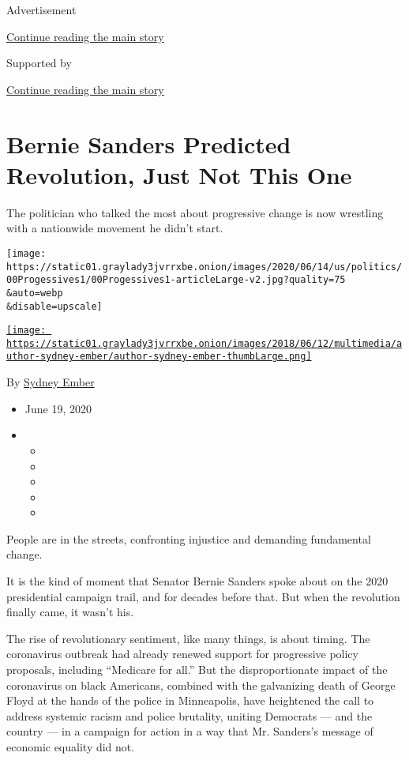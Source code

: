Advertisement

\protect\hyperlink{after-top}{Continue reading the main story}

Supported by

\protect\hyperlink{after-sponsor}{Continue reading the main story}

\hypertarget{bernie-sanders-predicted-revolution-just-not-this-one}{%
\section{Bernie Sanders Predicted Revolution, Just Not This
One}\label{bernie-sanders-predicted-revolution-just-not-this-one}}

The politician who talked the most about progressive change is now
wrestling with a nationwide movement he didn't start.

\texttt{[image: https://static01.graylady3jvrrxbe.onion/images/2020/06/14/us/politics/00Progessives1/00Progessives1-articleLarge-v2.jpg?quality=75\\\&auto=webp\\\&disable=upscale]}

\href{https://www.nytimes3xbfgragh.onion/by/sydney-ember}{\texttt{[image: https://static01.graylady3jvrrxbe.onion/images/2018/06/12/multimedia/author-sydney-ember/author-sydney-ember-thumbLarge.png]}}

By \href{https://www.nytimes3xbfgragh.onion/by/sydney-ember}{Sydney
Ember}

\begin{itemize}
\item
  June 19, 2020
\item
  \begin{itemize}
  \item
  \item
  \item
  \item
  \item
  \end{itemize}
\end{itemize}

People are in the streets, confronting injustice and demanding
fundamental change.

It is the kind of moment that Senator Bernie Sanders spoke about on the
2020 presidential campaign trail, and for decades before that. But when
the revolution finally came, it wasn't his.

The rise of revolutionary sentiment, like many things, is about timing.
The coronavirus outbreak had already renewed support for progressive
policy proposals, including ``Medicare for all.'' But the
disproportionate impact of the coronavirus on black Americans, combined
with the galvanizing death of George Floyd at the hands of the police in
Minneapolis, have heightened the call to address systemic racism and
police brutality, uniting Democrats --- and the country --- in a
campaign for action in a way that Mr. Sanders's message of economic
equality did not.

